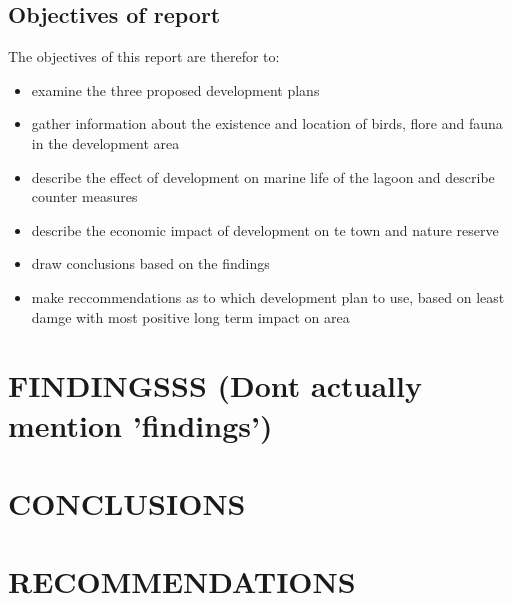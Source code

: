 \documentclass{article}
\begin{document}
\subsection{Objectives of report}
The objectives of this report are therefor to:
\begin{itemize}
	\item examine the three proposed development plans
	\item gather information about the existence and location of birds, flore and fauna in the development area
	\item describe the effect of development on marine life of the lagoon and describe counter measures
	\item describe the economic impact of development on te town and nature reserve
	\item draw conclusions based on the findings
	\item make reccommendations as to which development plan to use, based on least damge with most positive long term impact on area
\end{itemize}

\newpage
\section{FINDINGSSS (Dont actually mention 'findings')}

\newpage
\section{CONCLUSIONS}

\newpage
\section{RECOMMENDATIONS}

\newpage
\printbibliography
\end{document}

